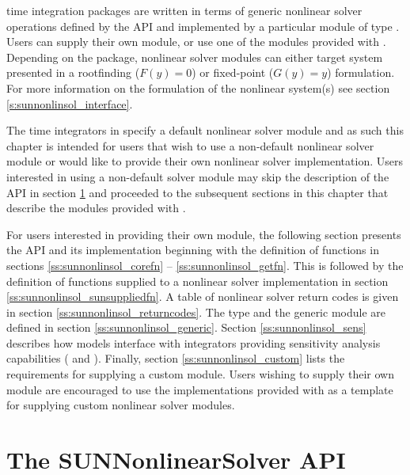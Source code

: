 {\sundials} time integration packages are written in terms of generic nonlinear
solver operations defined by the {\sunnonlinsol} API and implemented by a
particular {\sunnonlinsol} module of type \noindent{}.
Users can supply their own {\sunnonlinsol} module, or use one of the modules
provided with {\sundials}. Depending on the package, nonlinear solver modules
can either target system presented in a rootfinding ($F(y) = 0$) or fixed-point
($G(y) = y$) formulation. For more information on the formulation of the
nonlinear system(s) see section \ref{s:sunnonlinsol_interface}.

The time integrators in {\sundials} specify a default nonlinear solver module
and as such this chapter is intended for users that wish to use a non-default
nonlinear solver module or would like to provide their own nonlinear solver
implementation. Users interested in using a non-default solver module may skip
the description of the {\sunnonlinsol} API in section \ref{s:sunnonlinsol_api}
and proceeded to the subsequent sections in this chapter that describe the
{\sunnonlinsol} modules provided with {\sundials}.

For users interested in providing their own {\sunnonlinsol} module, the
following section presents the {\sunnonlinsol} API and its implementation
beginning with the definition of {\sunnonlinsol} functions in sections
\ref{ss:sunnonlinsol_corefn} -- \ref{ss:sunnonlinsol_getfn}. This is followed by
the definition of functions supplied to a nonlinear solver implementation in
section \ref{ss:sunnonlinsol_sunsuppliedfn}. A table of nonlinear solver return
codes is given in section \ref{ss:sunnonlinsol_returncodes}. The
 type and the generic {\sunnonlinsol} module are defined
in section \ref{ss:sunnonlinsol_generic}. Section \ref{ss:sunnonlinsol_sens}
describes how {\sunnonlinsol} models interface with {\sundials} integrators
providing sensitivity analysis capabilities ({\cvodes} and {\idas}). Finally,
section \ref{ss:sunnonlinsol_custom} lists the requirements for supplying a
custom {\sunnonlinsol} module. Users wishing to supply their own {\sunnonlinsol}
module are encouraged to use the {\sunnonlinsol} implementations provided with
{\sundials} as a template for supplying custom nonlinear solver
modules.


\section{The SUNNonlinearSolver API}
\label{s:sunnonlinsol_api}

